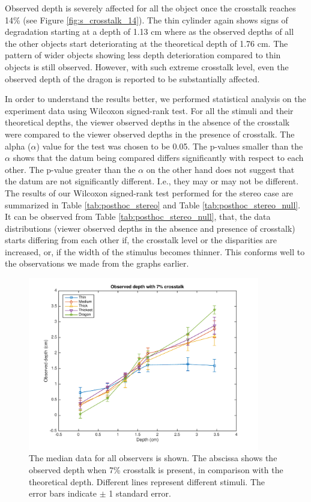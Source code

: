 Observed depth is severely affected for all the object once the crosstalk reaches 14\% (see Figure \ref{fig:s_crosstalk_14}). The thin cylinder again shows signs of degradation starting at a depth of 1.13 cm where as the observed depths of all the other objects start deteriorating at the theoretical depth of 1.76 cm. The pattern of wider objects showing less depth deterioration compared to thin objects is still observed. However, with such extreme crosstalk level, even the observed depth of the dragon is reported to be substantially affected.

In order to understand the results better, we performed statistical analysis on the experiment data using Wilcoxon signed-rank test. For all the stimuli and their theoretical depths, the viewer observed depths in the absence of the crosstalk were compared to the viewer observed depths in the presence of crosstalk. The alpha ($\alpha$) value for the test was chosen to be 0.05. The p-values smaller than the $\alpha$ shows that the datum being compared differs significantly with respect to each other. The p-value greater than the $\alpha$ on the other hand does not suggest that the datum are not significantly different. I.e., they may or may not be different. The results of our Wilcoxon signed-rank test performed for the stereo case are summarized in Table \ref{tab:posthoc_stereo} and Table \ref{tab:posthoc_stereo_null}. It can be observed from Table \ref{tab:posthoc_stereo_null}, that, the data distributions (viewer observed depths in the absence and presence of crosstalk) starts differing from each other if, the crosstalk level or the disparities are increased, or, if the width of the stimulus becomes thinner. This conforms well to the observations we made from the graphs earlier.
\pagebreak
\begin{figure}[H]
\centering
    \includegraphics[width=0.9\textwidth]{./Template_Figures/s_crosstalk_7}
    \caption{The median data for all observers is shown. The abscissa shows the observed depth when 7\% crosstalk is present, in comparison with the theoretical depth. Different lines represent different stimuli. The error bars indicate $\pm$ 1 standard error.\label{fig:s_crosstalk_7}}
\end{figure}

